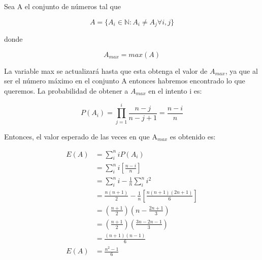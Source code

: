 Sea A el conjunto de números tal que

\begin{equation*}
    A=\{ A_i \in \mathbb{N} : A_i \neq A_j \forall i,j\}
\end{equation*}

donde

\begin{equation*}
    A_{max} = max(A)
\end{equation*}

La variable max se actualizará hasta que esta obtenga el valor de $A_{max}$, ya que al ser el número máximo en el conjunto A entonces habremos encontrado lo que queremos. La probabilidad de obtener a $A_{max}$ en el intento i es:

\begin{equation*}
    P(A_i) = \prod_{j=1}^i \frac{n-j}{n-j+1} = \frac{n-i}{n}
\end{equation*}

Entonces, el valor esperado de las veces en que A$_{max}$ es obtenido es:

\begin{align*}
    E(A) & = \sum_i^n i P(A_i)                                                  \\
         & = \sum_i^n i \left[\frac{n-i}{n}\right]                              \\
         & = \sum_i^n i - \frac{1}{n} \sum_i^n i^2                              \\
         & = \frac{n(n+1)}{2} - \frac{1}{n} \left[\frac{n(n+1)(2n+1)}{6}\right] \\
         & = \left(\frac{n+1}{2}\right) \left(n - \frac{2n+1}{3} \right)        \\
         & = \left( \frac{n+1}{2} \right) \left(\frac{3n-2n-1}{3} \right)       \\
         & = \frac{(n+1)(n-1)}{6}                                               \\
    E(A) & = \frac{n^2-1}{6}
\end{align*}